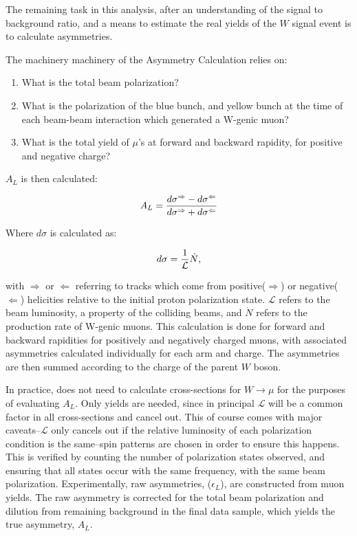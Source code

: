The remaining task in this analysis, after an understanding of the signal to
background ratio, and a means to estimate the real yields of the $W$ signal
event is to calculate asymmetries.

{\noindent}The machinery machinery of the Asymmetry Calculation relies on:

\begin{enumerate}
  \item What is the total beam polarization?
  \item What is the polarization of the blue bunch, and yellow bunch at the
    time of each beam-beam interaction which generated a W-genic muon?
  \item What is the total yield of $\mu$'s at forward and backward rapidity,
    for positive and negative charge?
\end{enumerate}

{\noindent}$A_L$ is then calculated:

\begin{equation}
  A_L = {
    {d\sigma^{\Rightarrow} - d\sigma^{\Leftarrow}}
    \over
    {d\sigma^{\Rightarrow} + d\sigma^{\Leftarrow}}
  }
\end{equation}

{\noindent}Where $d\sigma$ is calculated as:

\begin{equation}
  d\sigma = {1\over{\mathcal{L}}}{\dot{N}},
\end{equation}

with $\Rightarrow$ or $\Leftarrow$ referring to tracks which come from
positive($\Rightarrow$) or negative($\Leftarrow$) helicities relative to the
initial proton polarization state. $\mathcal{L}$ refers to the beam luminosity,
a property of the colliding beams, and $\dot{N}$ refers to the production rate
of W-genic muons. This calculation is done for forward and backward
rapidities for positively and negatively charged muons, with associated
asymmetries calculated individually for each arm and charge. The asymmetries are
then summed according to the charge of the parent $W$ boson.

In practice, does not need to calculate cross-sections for $W\rightarrow\mu$ for
the purposes of evaluating $A_L$. Only yields are needed, since in principal
$\mathcal{L}$ will be a common factor in all cross-sections and cancel out. This
of course comes with major caveats--$\mathcal{L}$ only cancels out if the
relative luminosity of each polarization condition is the same--spin patterns
are chosen in order to ensure this happens. This is verified by counting the
number of polarization states observed, and ensuring that all states occur with
the same frequency, with the same beam polarization.  Experimentally, raw
asymmetries, ($\epsilon_{L}$), are constructed from  muon
yields. The raw asymmetry is corrected for the total beam polarization and
dilution from remaining background in the final data sample, which yields the
true asymmetry, $A_L$.

